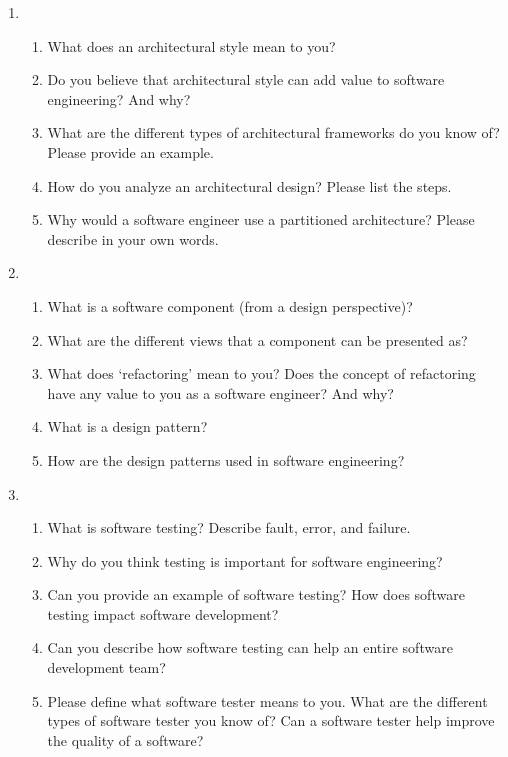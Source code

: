\documentclass[12pt]{article}
\begin{document}
\begin{enumerate}
    \item
    \begin{enumerate}[start=1,align=left]
      \item What does an architectural style mean to you? 
      \item Do you believe that architectural style can add value to software engineering? And why? 
      \item What are the different types of architectural frameworks do you know of? Please provide an example. 
      \item How do you analyze an architectural design? Please list the steps. 
      \item  Why would a software engineer use a partitioned architecture? Please describe in your own words.
    \end{enumerate}

    \item
    \begin{enumerate}[start=1,align=left]
      \item What is a software component (from a design perspective)? 
      \item What are the different views that a component can be presented as? 
      \item What does ‘refactoring’ mean to you? Does the concept of refactoring have any value to you as a software engineer? And why? 
      \item What is a design pattern? 
      \item How are the design patterns used in software engineering?
    \end{enumerate}

    \item
    \begin{enumerate}[start=1,align=left]
      \item What is software testing? Describe fault, error, and failure. 
      \item Why do you think testing is important for software engineering? 
      \item Can you provide an example of software testing? How does software testing impact software development? 
      \item Can you describe how software testing can help an entire software development team? 
      \item Please define what software tester means to you. What are the different types of software tester you know of? Can a software tester help improve the quality of a software?
    \end{enumerate}


\end{enumerate}
\end{document}
